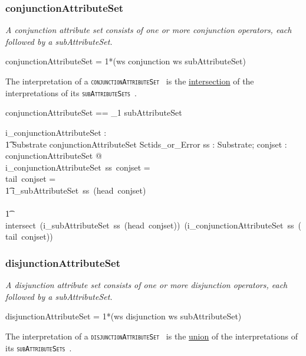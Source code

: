\documentclass{article}
\def\spec#1{{\tt \small \textsc{{#1}} }}
\def\bnf#1{{\scriptsize {{#1}} }}
\def\desc#1{{\small \textsl{{#1}} }}
\begin{document}
\subsubsection{conjunctionAttributeSet}
\begin{framed}
\desc{A conjunction attribute set consists of one or more conjunction operators, each followed by a subAttributeSet.}
\end{framed}
\begin{framed}
\noindent
\bnf{conjunctionAttributeSet = 1*(ws conjunction ws subAttributeSet)}
\end{framed}

The interpretation of a \spec{conjunctionAttributeSet } is the \underline{intersection} of the interpretations of its \spec{subAttributeSets}.


\begin{zed}
conjunctionAttributeSet ==  \seq_1 subAttributeSet 
\end{zed}

\begin{gendef}
    i\_conjunctionAttributeSet : \\
\t1 Substrate \fun conjunctionAttributeSet \fun Sctids\_or\_Error
\where
   \forall ss : Substrate;  conjset : conjunctionAttributeSet @ \\
   i\_conjunctionAttributeSet~ss~conjset = ~ \\
   \IF tail~conjset = \langle \rangle  \THEN \\
   \t1 i\_subAttributeSet~ss~(head~conjset) \\
\ELSE \\
\t1 intersect~(i\_subAttributeSet~ss~(head~conjset))~(i\_conjunctionAttributeSet~ss~(tail~conjset))
\end{gendef}


\subsubsection{disjunctionAttributeSet}
\begin{framed}
\desc{A disjunction attribute set consists of one or more disjunction operators, each followed by a subAttributeSet.}
\end{framed}
\begin{framed}
\noindent
\bnf{disjunctionAttributeSet = 1*(ws disjunction ws subAttributeSet)}
\end{framed}

The interpretation of a \spec{disjunctionAttributeSet } is the \underline{union} of the interpretations of its \spec{subAttributeSets}.
\end{document}

